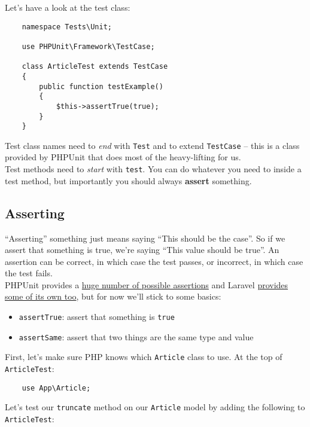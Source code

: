 Let's have a look at the test class:

\begin{verbatim}
    namespace Tests\Unit;

    use PHPUnit\Framework\TestCase;

    class ArticleTest extends TestCase
    {
        public function testExample()
        {
            $this->assertTrue(true);
        }
    }
\end{verbatim}

Test class names need to \textit{end} with \texttt{Test} and to extend \texttt{TestCase} – this is a class provided by PHPUnit that does most of the heavy-lifting for us.
\\

Test methods need to \textit{start} with \texttt{test}. You can do whatever you need to inside a test method, but importantly you should always \textbf{assert} something.

\subsection{Asserting}

``Asserting'' something just means saying ``This should be the case''. So if we assert that something is true, we're saying ``This value should be true''. An assertion can be correct, in which case the test passes, or incorrect, in which case the test fails.
\\

PHPUnit provides a \href{https://phpunit.readthedocs.io/en/9.0/assertions.html}{huge number of possible assertions} and Laravel \href{https://laravel.com/docs/master/http-tests#available-assertions}{provides some of its own too}, but for now we'll stick to some basics:

\begin{itemize}
    \item \texttt{assertTrue}: assert that something is \texttt{true}
    \item \texttt{assertSame}: assert that two things are the same type and value
\end{itemize}

First, let's make sure PHP knows which \texttt{Article} class to use. At the top of \texttt{ArticleTest}:

\begin{verbatim}
    use App\Article;
\end{verbatim}

Let's test our \texttt{truncate} method on our \texttt{Article} model by adding the following to \texttt{ArticleTest}:

